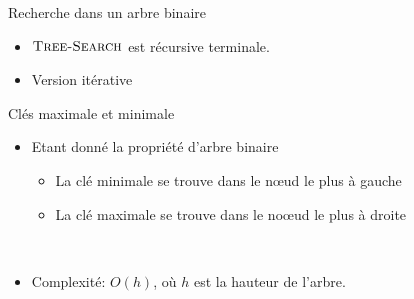 \begin{frame}{Recherche dans un arbre binaire}
\begin{itemize}
\item $\textnormal{\scshape Tree-Search}$ est récursive terminale.
\item Version itérative
\begin{center}
\begin{small}
\end{small}
\end{center}

\bigskip

\end{itemize}

\end{frame}

\begin{frame}{Clés maximale et minimale}
\begin{itemize}
\item Etant donné la propriété d'arbre binaire
\begin{itemize}
\item La clé minimale se trouve dans le n\oe ud le plus à gauche
\item La clé maximale se trouve dans le no\oe ud le plus à droite
\end{itemize}

\bigskip

\begin{center}
~~~~~
\end{center}

\bigskip

\item Complexité: $O(h)$, où $h$ est la hauteur de l'arbre.
\end{itemize}
\end{frame}

